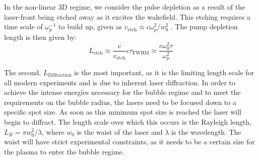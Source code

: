 \documentclass[12pt,letter]{article}
\begin{document}
    In the non-linear 3D regime, we consider the pulse depletion as a result of the
    laser-front being etched away as it excites the wakefield. This etching requires
    a time scale of $\omega_p^{-1}$ to build up, given as $v_\textrm{etch}
    \approx c \omega_p^2 /w_0^2$ \cite{deckedevolv}. The pump depletion
    length is then given by:
    \begin{equation}
        L_\textrm{etch} \approx \frac{c}{v_\textrm{etch} }c
    \tau_\textrm{FWHM} \approx \frac{c \omega_0^2 \tau}{\omega_p^2}
        \end{equation}

        The second, $L_\mathrm{Diffraction}$ is the most important, as it is
    the limiting length scale for all modern experiments and is due to inherent
    laser diffraction. In order to achieve the intense energies necessary
    for the bubble regime and to meet the requirements on the bubble radius, the lasers need to be focused down to a specific spot
    size. As soon as this minimum spot size is reached the laser will begin to
    diffract. The length scale over which this occurs is the Rayleigh length,
    $L_R = \pi w_0^2/\lambda$, where $w_0$ is the waist of the laser and $
    \lambda$ is the wavelength. The waist will have strict experimental
    constraints, as it needs to be a certain size for the plasma to enter the
    bubble regime. 
\end{document}
